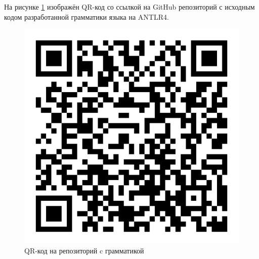 
На рисунке \ref{qr-lang} изображён QR-код со ссылкой на GitHub репозиторий с исходным кодом разработанной грамматики языка на ANTLR4.

\begin{figure}
  \includegraphics[scale=0.5]{./img/qr-code-relatio-lang.png}
  \caption{QR-код на репозиторий c грамматикой}
  \label{qr-lang}
\end{figure}
